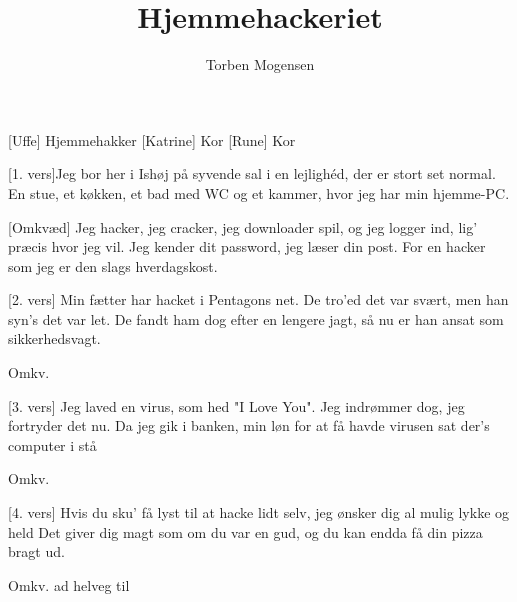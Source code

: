 \documentclass[danish]{article}
\title{Hjemmehackeriet}
\author{Torben Mogensen}
\begin{document}
\maketitle

\begin{roles}
  [Uffe] Hjemmehakker
  [Katrine] Kor
  [Rune] Kor
\end{roles}

\begin{song}
  [1. vers]Jeg bor her i Ishøj på syvende sal
  i en lejligh\'ed, der er stort set normal.
  En stue, et køkken, et bad med WC
  og et kammer, hvor jeg har min hjemme-PC.

  [Omkvæd] Jeg hacker, jeg cracker, jeg downloader spil,
  og jeg logger ind, lig' præcis hvor jeg vil.
  Jeg kender dit password, jeg læser din post.
  For en hacker som jeg er den slags hverdagskost.

  [2. vers] Min fætter har hacket i Pentagons net.
  De tro'ed det var svært, men han syn's det var let.
  De fandt ham dog efter en lengere jagt,
  så nu er han ansat som sikkerhedsvagt.

  Omkv.
  
  [3. vers] Jeg laved en virus, som hed "I Love You".
  Jeg indrømmer dog, jeg fortryder det nu.
  Da jeg gik i banken, min løn for at få
  havde virusen sat der's computer i stå

  Omkv.

  [4. vers] Hvis du sku' få lyst til at hacke lidt selv,
  jeg ønsker dig al mulig lykke og held
  Det giver dig magt som om du var en gud,
  og du kan endda få din pizza bragt ud.
  
  Omkv. ad helveg til

\end{song}
\end{document}
